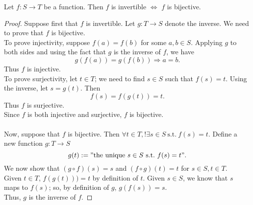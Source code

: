 \documentclass[math1530-lecture-notes.tex]{subfiles}
\begin{document}
\begin{theorem}{}
  Let $f:S\to T$ be a function. Then $f$ is invertible $\iff$ $f$ is bijective.
\end{theorem}
\begin{proof}[Proof]
  Suppose first that $f$ is invertible. Let $g:T\to S$ denote the inverse. We need to prove that
  $f$ is bijective. \\
  To prove injectivity, suppose $f(a)=f(b)$ for some $a,b\in S$. Applying $g$ to both sides and
  using the fact that $g$ is the inverse of $f$, we have \[
    g(f(a)) = g(f(b)) \Rightarrow a = b
  .\] Thus $f$ is injective. \\
  To prove surjectivity, let $t\in T$; we need to find $s\in S$ such that $f(s) = t$. Using the
  inverse, let  $s=g(t)$. Then  \[
    f(s) = f(g(t)) = t
  .\] Thus $f$ is surjective. \\
  Since $f$ is both injective and surjective, $f$ is bijective. \\ \\
  Now, suppose that $f$ is bijective. Then $ \forall t\in T, !\exists s \in S ~\text{s.t.}~f(s)=t$.
  Define a new function $g:T\to S$ \[
    g(t) := "\text{the unique}~ s \in S ~\text{s.t.}~f(s) = t"
  .\] We now show that $(g\circ f)(s) = s$ and $(f\circ g)(t) = t$ for $s \in S, t \in T$. \\
  Given $t\in T$, $f(g(t))) = t$ by definition of $t$. Given $s \in S$, we know that $s$ maps to
  $f(s)$; so, by definition of $g$, $g(f(s)) = s$. \\
  Thus, $g$ is the inverse of $f$.
\end{proof}
\end{document}
